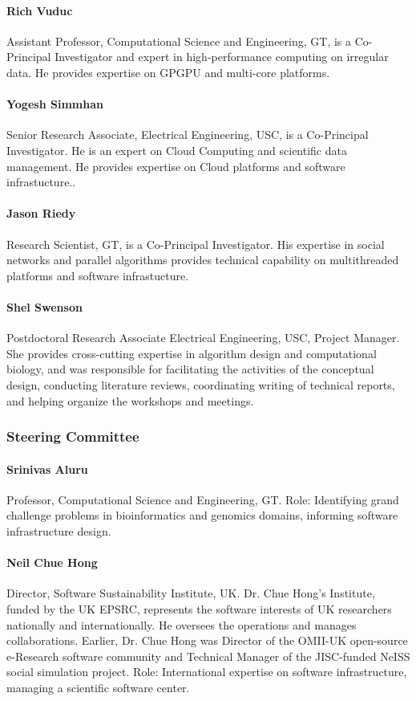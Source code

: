 \paragraph{Rich Vuduc} Assistant Professor, Computational Science and Engineering, GT, is a Co-Principal
Investigator and expert in high-performance computing on irregular data. He provides
expertise on GPGPU and multi-core platforms.


\paragraph{Yogesh Simmhan} Senior Research Associate, Electrical Engineering, USC, is a Co-Principal
Investigator. He is an expert on Cloud Computing and scientific data management. He
provides expertise on Cloud platforms and software infrastucture..

\paragraph{Jason Riedy} Research Scientist, GT, is a Co-Principal Investigator. His expertise in social networks
and parallel algorithms provides technical capability on multithreaded platforms and software
infrastucture. 

\paragraph{Shel Swenson} Postdoctoral Research Associate Electrical Engineering, USC, Project Manager.
 She provides cross-cutting expertise in algorithm design and computational biology, and
was responsible for facilitating the activities of the conceptual design, conducting literature
reviews, coordinating writing of technical reports, and helping organize the workshops and meetings.

\subsubsection{Steering Committee}

\paragraph{Srinivas Aluru} Professor, Computational Science and Engineering, GT.
Role: Identifying grand challenge problems in bioinformatics and genomics domains,
informing software infrastructure design.

\paragraph{Neil Chue Hong} Director, Software Sustainability Institute, UK. Dr. Chue Hong’s Institute,
funded by the UK EPSRC, represents the software interests of UK researchers nationally
and internationally. He oversees the operations and manages collaborations. Earlier, Dr.
Chue Hong was Director of the OMII-UK open-source e-Research software community and
Technical Manager of the JISC-funded NeISS social simulation project. Role: International
expertise on software infrastructure, managing a scientific software center.

